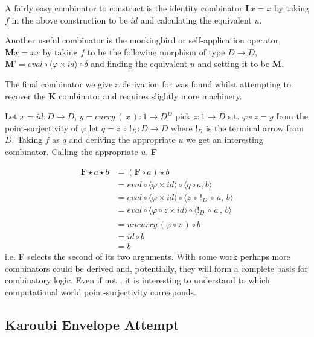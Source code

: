 \documentclass[a4paper,10pt]{article}
\begin{document}
A fairly easy combinator to construct is the identity combinator $\textbf{I} \, x =
x$ by taking $f$ in the above construction to be $id$ and calculating the
equivalent $u$.

Another useful combinator is the mockingbird or self-application operator,
$\textbf{M} x = x x$ by taking $f$ to be the following morphism of type $D
\rightarrow D$, $\textbf{M'} = eval \circ \langle \varphi \times id \rangle \circ
\delta$ and finding the equivalent $u$ and setting it to be \textbf{M}.

The final combinator we give a derivation for was found whilst attempting to
recover the \textbf{K} combinator and requires slightly more machinery.

Let $x = id : D \rightarrow D$, $y = curry \, ( \, \underline{x} \, ) : 1
\rightarrow D^D$ pick $z : 1 \rightarrow D$ s.t. $\varphi \circ z = y$ from the
point-surjectivity of $\varphi$ let $q = z \, \circ \, !_{D} : D \rightarrow D$
where $!_{D}$ is the terminal arrow from $D$. Taking $f$ as $q$ and deriving the
appropriate $u$ we get an interesting combinator. Calling the appropriate
$u$, \textbf{F}

\begin{align*}
    \textbf{F} \star a \star b &= (\textbf{F} \circ a) \star b \\
    &= eval \circ \langle \varphi  \times id \rangle \circ \langle q \circ a , b
    \rangle \\
    &= eval \circ \langle \varphi \times id \rangle \circ \langle z \, \circ \, !_{D}
    \, \circ \, a , \, b \rangle \\
    &= eval \circ \langle \varphi \circ z \times id \rangle \circ \langle !_{D} \,
    \circ \, a \, , \, b \rangle \\
    &= \overline{uncurry \, ( \varphi \circ z \, )} \circ b \\
    &= id \circ b \\
    &= b
\end{align*}
i.e. \textbf{F} selects the second of its two arguments. With some work perhaps
more combinators could be derived and, potentially, they will form a complete
basis for combinatory logic. Even if not , it is interesting to understand to
which computational world point-surjectivity corresponds.

\subsection{Karoubi Envelope Attempt}
\end{document}
